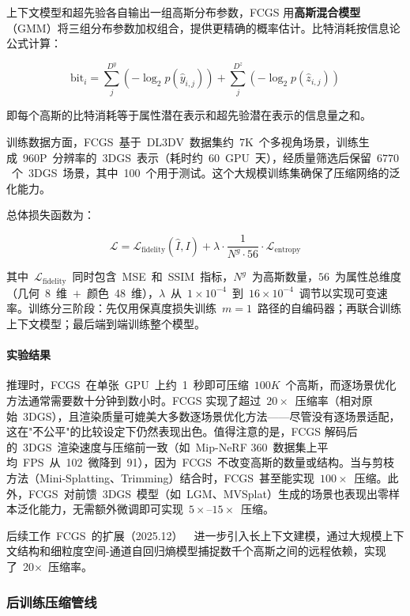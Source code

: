 上下文模型和超先验各自输出一组高斯分布参数，FCGS 用\textbf{高斯混合模型}（GMM）将三组分布参数加权组合，提供更精确的概率估计。比特消耗按信息论公式计算：

\begin{equation}
\mathrm{bit}_i = \sum_j^{D^y} (-\log_2 p(\hat{y}_{i,j})) + \sum_j^{D^z} (-\log_2 p(\hat{z}_{i,j}))
\end{equation}

即每个高斯的比特消耗等于属性潜在表示和超先验潜在表示的信息量之和。

训练数据方面，FCGS~基于~DL3DV~数据集约~7K~个多视角场景，训练生成~960P~分辨率的~3DGS~表示（耗时约~60~GPU~天），经质量筛选后保留~$6770$~个~3DGS~场景，其中~100~个用于测试。这个大规模训练集确保了压缩网络的泛化能力。

总体损失函数为：

\begin{equation}
\mathcal{L} = \mathcal{L}_{\mathrm{fidelity}}(\hat{I}, I) + \lambda \cdot \frac{1}{N^g \cdot 56} \cdot \mathcal{L}_{\mathrm{entropy}}
\end{equation}

其中~$\mathcal{L}_{\mathrm{fidelity}}$~同时包含~MSE~和~SSIM~指标，$N^g$~为高斯数量，$56$~为属性总维度（几何~8~维~$+$~颜色~48~维），$\lambda$~从~$1 \times 10^{-4}$~到~$16 \times 10^{-4}$~调节以实现可变速率。训练分三阶段：先仅用保真度损失训练~$m=1$~路径的自编码器；再联合训练上下文模型；最后端到端训练整个模型。

\paragraph{实验结果}

推理时，FCGS~在单张~GPU~上约~1~秒即可压缩~$100K$~个高斯，而逐场景优化方法通常需要数十分钟到数小时。FCGS 实现了超过~$20\times$~压缩率（相对原始~3DGS），且渲染质量可媲美大多数逐场景优化方法——尽管没有逐场景适配，这在"不公平"的比较设定下仍然表现出色。值得注意的是，FCGS 解码后的~3DGS~渲染速度与压缩前一致（如~Mip-NeRF 360~数据集上平均~FPS~从~102~微降到~91），因为~FCGS~不改变高斯的数量或结构。当与剪枝方法（Mini-Splatting、Trimming）结合时，FCGS~甚至能实现~$100\times$~压缩。此外，FCGS~对前馈~3DGS~模型（如~LGM、MVSplat）生成的场景也表现出零样本泛化能力，无需额外微调即可实现~$5\times$--$15\times$~压缩。

后续工作~FCGS~的扩展（2025.12）~\cite{2512_00877}~进一步引入长上下文建模，通过大规模上下文结构和细粒度空间-通道自回归熵模型捕捉数千个高斯之间的远程依赖，实现了~20$\times$~压缩率。

\subsubsection{后训练压缩管线}

